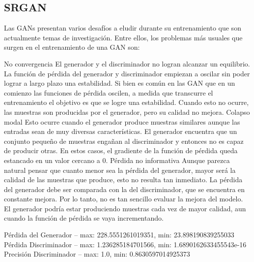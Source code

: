 \subsection{SRGAN}
Las GANs presentan varios desafíos a eludir durante su entrenamiento
que son actualmente temas de investigación. Entre ellos, los problemas más
usuales que surgen en el entrenamiento de una GAN son:

No convergencia
El generador y el discriminador no logran alcanzar un equilibrio. La
función de pérdida del generador y discriminador empiezan a oscilar sin
poder lograr a largo plazo una estabilidad.
Si bien es común en las GAN que en un comienzo las funciones de pérdida
oscilen, a medida que transcurre el entrenamiento el objetivo es que se
logre una estabilidad. Cuando esto no ocurre, las muestras son producidas
por el generador, pero su calidad no mejora.
Colapso modal
Esto ocurre cuando el generador produce muestras similares aunque las
entradas sean de muy diversas características. El generador encuentra que
un conjunto pequeño de muestras engañan al discriminador y entonces
no es capaz de producir otras. En estos casos, el gradiente de la función
de pérdida queda estancado en un valor cercano a 0.
Pérdida no informativa
Aunque parezca natural pensar que cuanto menor sea la pérdida del
generador, mayor será la calidad de las muestras que produce, esto no
resulta tan inmediato. La pérdida del generador debe ser comparada con
la del discriminador, que se encuentra en constante mejora. Por lo tanto,
no es tan sencillo evaluar la mejora del modelo. El generador podría estar
produciendo muestras cada vez de mayor calidad, aun cuando la función
de pérdida se vaya incrementando.


Pérdida del Generador -- max: 228.5551261019351, min: 23.898190839255033
Pérdida Discriminador -- max: 1.236285184701566, min: 1.6890162633455543e-16
Precisión Discriminador -- max: 1.0, min: 0.8630597014925373
